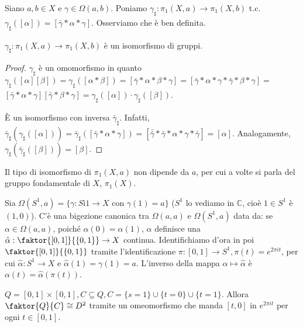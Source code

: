 Siano $a, b \in X$ e $\gamma \in \Omega(a, b)$. Poniamo $\gamma_{\sharp}: \pi_1(X, a) \rightarrow \pi_1(X, b)$ t.c. $\gamma_{\sharp}([\alpha])=[\bar{\gamma} * \alpha * \gamma]$. Osserviamo che è ben definita.

\begin{thm}
  $\gamma_{\sharp}: \pi_1(X, a) \rightarrow \pi_1(X, b)$ è un isomorfismo di gruppi.
  \begin{proof}
    $\gamma_{\sharp}$ è un omomorfismo in quanto $\gamma_{\sharp}([\alpha][\beta])=\gamma_{\sharp}([\alpha * \beta])=[\bar{\gamma} * \alpha * \beta * \gamma]=[\bar{\gamma} * \alpha * \gamma * \bar{\gamma} * \beta * \gamma]=$
    $[\bar{\gamma} * \alpha * \gamma][\bar{\gamma} * \beta * \gamma]=\gamma_{\sharp}([\alpha]) \cdot \gamma_{\sharp}([\beta])$.

    È un isomorfismo con inversa $\bar{\gamma}_{\sharp}$. Infatti,
    $\bar{\gamma}_{\sharp}(\gamma_{\sharp}([\alpha]))=\bar{\gamma}_{\sharp}([\bar{\gamma} * \alpha * \gamma])=[\bar{\bar{\gamma}} * \bar{\gamma} * \alpha * \gamma * \bar{\gamma}]=[\alpha]$.
    Analogamente, $\gamma_{\sharp}(\bar{\gamma}_{\sharp}([\beta]))=[\beta]$.
  \end{proof}
\end{thm}

\begin{cor}
  Il tipo di isomorfismo di $\pi_1(X, a)$ non dipende da $a$, per cui a volte si parla del gruppo fondamentale di $X$, $\pi_1(X)$.
\end{cor}

\begin{defn}
  Sia $\Omega(S^1, a)=\{ \gamma: Sì1 \rightarrow X \text{ con } \gamma(1)=a\}$ ($S^1$ lo vediamo in $\mathbb{C}$, cioè $1 \in S^1$ è $(1, 0)$). C'è una bigezione canonica tra $\Omega(a, a)$ e $\Omega(S^1, a)$ data da: se $\alpha \in \Omega(a, a)$, poiché
  $\alpha(0)=\alpha(1)$, $\alpha$ definisce una $\hat{\alpha}: \faktor{[0, 1]}{\{0, 1\}} \rightarrow X$ continua. Identifichiamo d'ora in poi $\faktor{[0, 1]}{\{0, 1\}}$ tramite l'identificazione $\pi: [0, 1] \rightarrow S^1, \pi(t)=e^{2 \pi i t}$, per cui
  $\hat{\alpha}:S^1 \rightarrow X$ e $\hat{\alpha}(1)=\gamma(1)=a$. L'inverso della mappa $\alpha \mapsto \hat{\alpha}$ è $\alpha(t)=\hat{\alpha}(\pi(t))$.
\end{defn}

\begin{lm} \label{Q/C=D^2}
  $Q=[0, 1] \times [0, 1], C \subseteq Q, C=\{s=1\} \cup \{t=0\} \cup \{t=1\}$. Allora $\faktor{Q}{C} \cong D^2$ tramite un omeomorfismo che manda $[t, 0]$ in $e^{2 \pi i t}$ per ogni $t \in [0, 1]$.
\end{lm}

